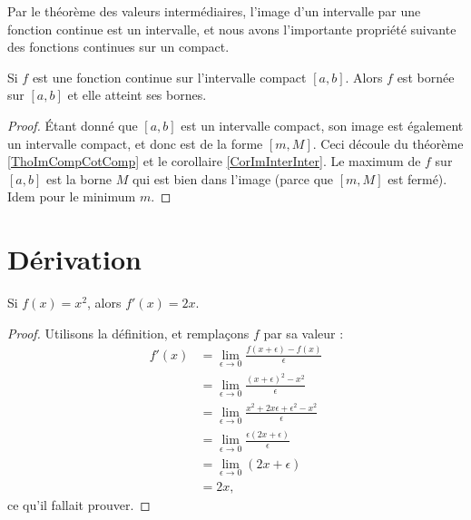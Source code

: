 Par le théorème des valeurs intermédiaires, l'image d'un intervalle par une fonction continue est un intervalle, et nous avons l'importante propriété suivante des fonctions continues sur un compact.

\begin{theorem}
    Si $f$ est une fonction continue sur l'intervalle compact $[a,b]$. Alors $f$ est bornée sur $[a,b]$ et elle atteint ses bornes.
\end{theorem}

\begin{proof}
    Étant donné que $[a,b]$ est un intervalle compact, son image est également un intervalle compact, et donc est de la forme $[m,M]$. Ceci découle du théorème \ref{ThoImCompCotComp} et le corollaire \ref{CorImInterInter}. Le maximum de $f$ sur $[a,b]$ est la borne $M$ qui est bien dans l'image (parce que $[m,M]$ est fermé). Idem pour le minimum $m$.
\end{proof}

\section{Dérivation}

\begin{lemma}           \label{LemDeccCarr}
    Si $f(x)=x^2$, alors $f'(x)=2x$.
\end{lemma}

\begin{proof}
    Utilisons la définition, et remplaçons $f$ par sa valeur :
    \begin{subequations}
        \begin{align}
            f'(x)   &=\lim_{\epsilon\to 0}\frac{ f(x+\epsilon)-f(x) }{ \epsilon }\\
                &=\lim_{\epsilon\to 0}\frac{ (x+\epsilon)^2-x^2 }{ \epsilon }\\
                &=\lim_{\epsilon\to 0}\frac{ x^2+2x\epsilon+\epsilon^2-x^2 }{ \epsilon }\\
                &=\lim_{\epsilon\to 0}\frac{\epsilon(2x+\epsilon)}{ \epsilon }\\
                &=\lim_{\epsilon\to 0}(2x+\epsilon)\\
                &=2x,
        \end{align}
    \end{subequations}
    ce qu'il fallait prouver.
\end{proof}

